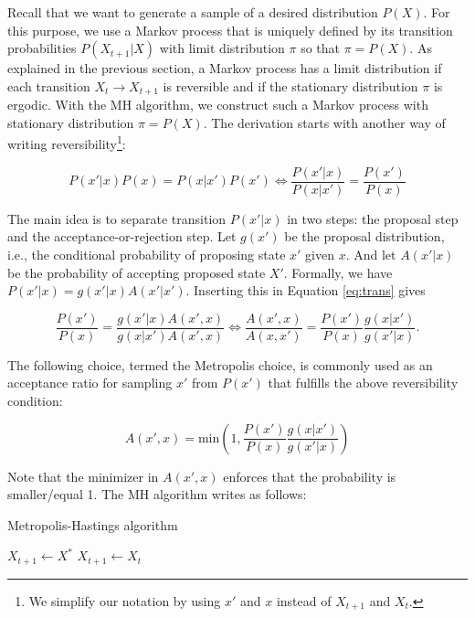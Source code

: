 \documentclass[12pt,english,a4paper,oneside]{article}
\theoremstyle{definition}
\theoremstyle{definition}
\theoremstyle{definition}
\theoremstyle{definition}
\theoremstyle{remark}
\begin{document}
Recall that we want to generate a sample of a desired distribution \(P(X)\). For
this purpose, we use a Markov process that is uniquely defined by its transition probabilities
\(P(X_{t+1}|X)\) with limit distribution \(\pi\) so that \(\pi=P(X)\). As explained in the previous section, a Markov process has a limit distribution if each transition \(X_t \rightarrow X_{t+1}\) is reversible and if the stationary distribution \(\pi\) is ergodic. With the MH algorithm, we construct such a Markov process with stationary distribution \(\pi=P(X)\). The derivation starts
with another way of writing reversibility\footnote{We simplify our notation by using \(x'\) and \(x\) instead of \(X_{t+1}\) and \(X_t\).}:

\begin{equation}
P(x'|x)P(x) = P(x|x')P(x') \iff \frac{P(x'|x)}{P(x|x')} = \frac{P(x')}{P(x)}
\label{eq:trans}
\end{equation}

\noindent
The main idea is to separate transition \(P(x'|x)\) in two steps: the proposal step
and the acceptance-or-rejection step. Let \(g(x')\) be the proposal distribution, i.e.,
the conditional probability of proposing state \(x'\) given \(x\). And let \(A(x'|x)\) be the probability of accepting proposed state \(X'\). Formally, we have
\(P(x'|x)=g(x'|x) A(x'|x')\). Inserting this in Equation \eqref{eq:trans} gives

\begin{equation}
\frac{P(x')}{P(x)} = \frac{g(x'|x)A(x',x)}{g(x|x')A(x',x)} \iff \frac{A(x',x)}{A(x,x')} = \frac{P(x')}{P(x)}\frac{g(x|x')}{g(x'|x)}.
\label{eq:two-steps}
\end{equation}

\noindent
The following choice, termed the Metropolis choice, is commonly used as an acceptance ratio for sampling \(x'\) from \(P(x')\) that fulfills the above reversibility condition:

\begin{equation}
A(x',x) = \text{min}\left( 1, \frac{P(x')}{P(x)}\frac{g(x|x')}{g(x'|x)} \right)
\label{eq:Metropolis-choice}
\end{equation}

\noindent
Note that the minimizer in \(A(x',x)\) enforces that the probability is smaller/equal 1. The MH algorithm writes as follows:

\begin{algorithm}[H]
\caption{Metropolis-Hastings algorithm}
\begin{algorithmic}

              \State $X_{t+1} \gets X^*$
          \Else
              \State $X_{t+1} \gets X_t$
\EndIf 
        \EndFor   
\end{algorithmic}
\end{algorithm}
\end{document}
